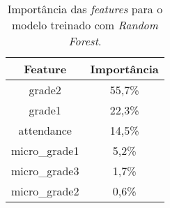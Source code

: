 \begin{table}[!htb]
    \centering
    \caption{Importância das \textit{features} para o modelo treinado com \textit{Random Forest}.}
    \begin{tabular}{@{}cc@{}}
        \hline
        \textbf{ Feature } & \textbf{ Importância } \\ \hline
        grade2  & 55,7\% \\
        grade1  & 22,3\% \\
        attendance  & 14,5\% \\
        micro\_grade1  & 5,2\% \\
        micro\_grade3  & 1,7\% \\
        micro\_grade2  & 0,6\% \\ \bottomrule
    \end{tabular}
    \label{tab:importanciaRandom}
\end{table}